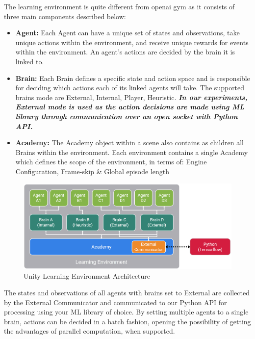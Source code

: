 The learning environment is quite different from openai gym as it consists of three main components described below:

\begin{itemize}
	\item \textbf{Agent:} Each Agent can have a unique set of states and observations, take unique actions within the environment, and receive unique rewards for events within the environment. An agent’s actions are decided by the brain it is linked to.
	\item \textbf{Brain:} Each Brain defines a specific state and action space and is responsible for deciding which actions each of its linked agents will take. The supported brains mode are External, Internal, Player, Heuristic. \textit{\textbf{In our experiments, External mode is used as the action decisions are made using ML library through communication over an open socket with Python API.}}
	\item \textbf{Academy:} The Academy object within a scene also contains as children all Brains within the environment. Each environment contains a single Academy which defines the scope of the environment, in terms of: Engine Configuration, Frame-skip \& Global episode length
\end{itemize}

\begin{figure}[!htb]
	\centering
	\includegraphics[width=\linewidth]{figures/unity_api.png}
	\caption{Unity Learning Environment Architecture}
	\label{fig:unity_api}
\end{figure}

The states and observations of all agents with brains set to External are collected by the External Communicator and communicated to our Python API for processing using your ML library of choice. By setting multiple agents to a single brain, actions can be decided in a batch fashion, opening the possibility of getting the advantages of parallel computation, when supported.

